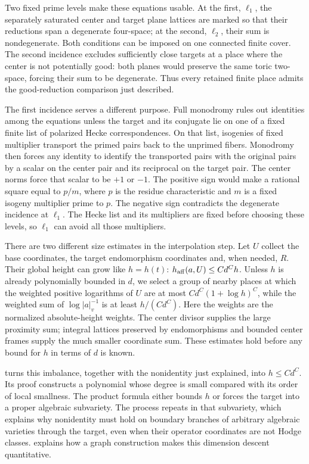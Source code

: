 Two fixed prime levels make these equations usable. At the first,
$\ell_1$, the separately saturated center and target plane lattices are
marked so that their reductions span a degenerate four-space; at the
second, $\ell_2$, their sum is nondegenerate. Both conditions can be
imposed on one connected finite cover. The second incidence excludes
sufficiently close targets at a place where the center is not potentially
good: both planes would preserve the same toric two-space, forcing their
sum to be degenerate. Thus every retained finite place admits the
good-reduction comparison just described.

The first incidence serves a different purpose. Full monodromy rules out
identities among the equations unless the target and its conjugate lie
on one of a fixed finite list of polarized Hecke correspondences. On that
list, isogenies of fixed multiplier transport the primed pairs back to
the unprimed fibers. Monodromy then forces any identity to identify the
transported pairs with the original pairs by a scalar on the center pair
and its reciprocal on the target pair. The center norms force that
scalar to be $+1$ or $-1$. The positive sign would
make a rational square equal to $p/m$, where $p$ is the residue
characteristic and $m$ is a fixed isogeny multiplier prime to $p$.
The negative sign contradicts the degenerate incidence at $\ell_1$.
The Hecke list and its multipliers are fixed before choosing these
levels, so $\ell_1$ can avoid all those multipliers.

There are two different size estimates in the interpolation step. Let
$U$ collect the base coordinates, the target endomorphism coordinates
and, when needed, $R$. Their global height can grow like $h=h(t)$:
$h_{\rm aff}(a,U)\leq Cd^C h$. Unless $h$ is already polynomially
bounded in $d$, we select a group of nearby places at which the weighted
positive logarithms of $U$ are at most $Cd^C(1+\log h)^C$, while
the weighted sum of $\log|a|_v^{-1}$ is at least
$h/(Cd^C)$. Here the weights are the normalized absolute-height weights.
The center divisor supplies the large proximity sum; integral lattices
preserved by endomorphisms and bounded center frames supply the much
smaller coordinate sum. These estimates hold before any bound for $h$
in terms of $d$ is known.

 turns this imbalance, together with the nonidentity
just explained, into $h\leq Cd^C$. Its proof constructs a polynomial
whose degree is small compared with its order of local smallness.
The product formula either bounds $h$ or forces the target into a
proper algebraic subvariety. The process repeats in that subvariety,
which explains why nonidentity must hold on boundary branches of
arbitrary algebraic varieties through the target, even when their
operator coordinates are not Hodge classes.  explains how a graph construction
makes this dimension descent quantitative.

